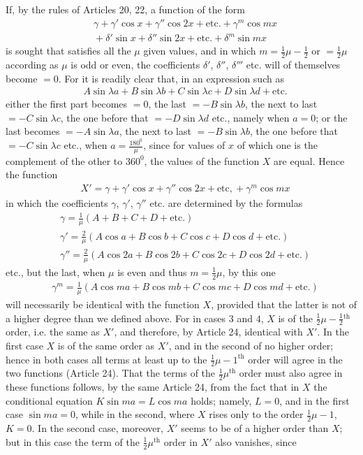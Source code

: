 If, by the rules of Articles 20, 22, a function of the form
\[
\begin{aligned}
&\gamma+\gamma'\cos x+\gamma''\cos2x+\mathrm{etc.}+\gamma^m\cos mx\\[5pt]
&{}+\delta'\sin x+\delta''\sin2x+\mathrm{etc.}+\delta^m\sin mx
\end{aligned}
\]
is sought that satisfies all the $\mu$ given values, and in which $m=\frac12\mu-\frac12$ or $=\frac12\mu$ according as $\mu$ is odd or even, the coefficients $\delta'$, $\delta''$, $\delta'''$ etc. will of themselves become $=0$. For it is readily clear that, in an expression such as
\[
\begin{aligned}
&A\sin\lambda a+B\sin\lambda b+C\sin\lambda c+D\sin\lambda d+\mathrm{etc.}
\end{aligned}
\]
either the first part becomes $=0$, the last $=-B\sin\lambda b$, the next to last $=-C\sin\lambda c$, the one before that $=-D\sin\lambda d$ etc., namely when $a=0$; or the last becomes $=-A\sin\lambda a$, the next to last $=-B\sin\lambda b$, the one before that $=-C\sin\lambda c$ etc., when $a=\frac{180^{\mathord{0}}}{\mu}$, since for values of $x$ of which one is the complement of the other to $360^{\mathord{0}}$, the values of the function $X$ are equal. 
Hence the function
\[
\begin{aligned}
&X'=\gamma+\gamma'\cos x+\gamma''\cos2x+\mathrm{etc,}+\gamma^m\cos mx
\end{aligned}
\]
in which the coefficients $\gamma$, $\gamma'$, $\gamma''$ etc. are determined by the formulas
\[
\begin{aligned}
&\gamma = \frac{1}{\mu}(A+B+C+D+\mathrm{etc.})\\[5pt]
&\gamma' = \frac{2}{\mu}(A\cos a+B\cos b+C\cos c+D\cos d+\mathrm{etc.})\\[5pt]
&\gamma'' = \frac{2}{\mu}(A\cos 2a+B\cos 2b+C\cos 2c+D\cos 2d+\mathrm{etc.})
\end{aligned}
\]
etc., but the last, when $\mu$ is even and thus $m=\frac12\mu$, by this one
\[
\begin{aligned}
&\gamma^m=\frac{1}{\mu}(A\cos ma+B\cos mb+C\cos mc+D\cos md+\mathrm{etc.})
\end{aligned}
\]
will necessarily be identical with the function $X$, provided that the latter is not of a higher degree than we defined above. For in cases $3$ and $4$, $X$ is of the $\frac12\mu-\frac12{}^{\mathrm{th}}$ order, i.e. the same as $X'$, and therefore, by Article 24, identical with $X'$. In the first case $X$ is of the same order as $X'$, and in the second of no higher order; hence in both cases all terms at least up to the $\frac12\mu-1^{\mathrm{th}}$ order will agree in the two functions (Article 24). That the terms of the $\frac12\mu^{\mathrm{th}}$ order must also agree in these functions follows, by the same Article 24, from the fact that in $X$ the conditional equation $K\sin ma=L\cos ma$ holds; namely, $L=0$, and in the first case $\sin ma=0$, while in the second, where $X$ rises only to the order $\frac12\mu-1$, $K=0$. In the second case, moreover, $X'$ seems to be of a higher order than $X$; but in this case the term of the $\frac12\mu^{\mathrm{th}}$ order in $X'$ also vanishes, since
